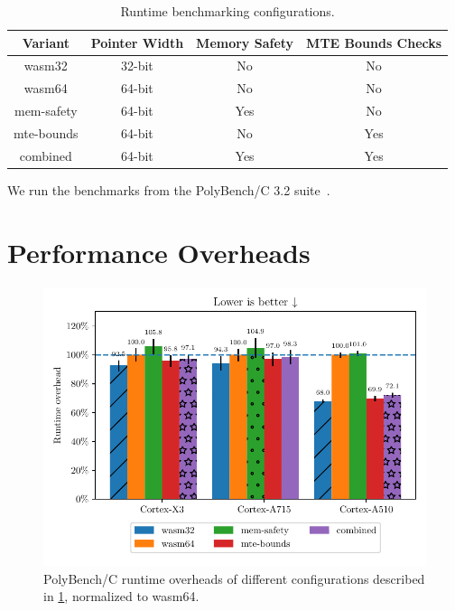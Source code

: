 \begin{table}[ht]
    \centering
    \small
    \caption{Runtime benchmarking configurations.}
    \label{tab:benchmark-variants}
    \begin{tabular}{c || c|c|c}
        \textbf{Variant} & \textbf{Pointer Width} & \textbf{Memory Safety} & \textbf{MTE Bounds Checks} \\
        \hline
        wasm32           & 32-bit                 & No                     & No                         \\
        wasm64           & 64-bit                 & No                     & No                         \\
        mem-safety       & 64-bit                 & Yes                    & No                         \\
        mte-bounds       & 64-bit                 & No                     & Yes                        \\
        combined         & 64-bit                 & Yes                    & Yes                        \\
    \end{tabular}
\end{table}

\noindent
We run the benchmarks from the PolyBench/C 3.2 suite~\cite{polybenchc}.


\section{Performance Overheads}
\label{sec:performance-overheads}

\begin{figure}[ht]
    \centering
    \includegraphics{plots/runtimes-all}
    \caption{PolyBench/C runtime overheads of different configurations described in \cref{tab:benchmark-variants}, normalized to wasm64.}
    \label{fig:runtime-overheads-combined}
\end{figure}

